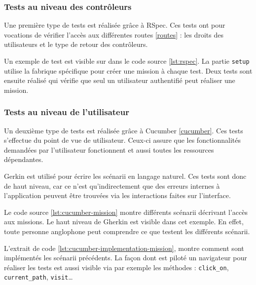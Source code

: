 \subsubsection{Tests au niveau des contrôleurs}
Une première type de tests est réalisée grâce à RSpec. Ces tests ont pour vocations de vérifier l'accès aux différentes routes \ref{routes} : les droits des utilisateurs et le type de retour des contrôleurs.

Un exemple de test est visible sur dans le code source \ref{lst:rspec}. La partie \texttt{setup} utilise la fabrique spécifique pour créer une mission à chaque test. Deux tests sont ensuite réalisé qui vérifie que seul un utilisateur authentifié peut réaliser une mission.



\subsubsection{Tests au niveau de l'utilisateur}
Un deuxième type de tests est réalisée grâce à Cucumber \ref{cucumber}. Ces tests s'effectue du point de vue de utilisateur.  Ceux-ci assure que les fonctionnalités demandées par l'utilisateur fonctionnent et aussi toutes les ressources dépendantes. 

Gerkin est utilisé pour écrire les scénarii en langage naturel. Ces tests sont donc de haut niveau, car ce n'est qu’indirectement que des erreurs internes à l'application peuvent être trouvées via les interactions faites sur l'interface.




Le code source \ref{lst:cucumber-mission} montre différents scénarii décrivant l'accès aux missions. Le haut niveau de Gherkin est visible dans cet exemple. En effet, toute personne anglophone peut comprendre ce que testent les différents scénarii. 

L'extrait de code \ref{lst:cucumber-implementation-mission}, montre comment sont implémentés les scénarii précédents. La façon dont est piloté un navigateur pour réaliser les tests est aussi visible via par exemple les méthodes : \texttt{click\_on}, \texttt{current\_path}, \texttt{visit}\ldots

